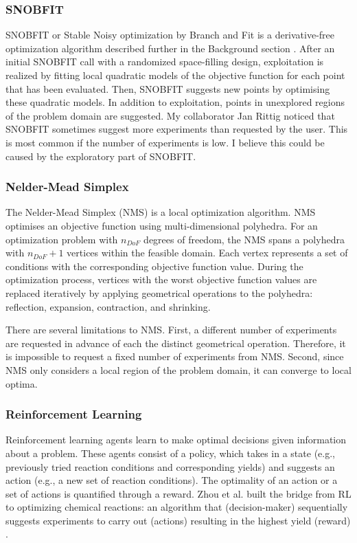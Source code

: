 \subsubsection{SNOBFIT}
SNOBFIT or Stable Noisy optimization by Branch and Fit is a derivative-free optimization algorithm described further in the Background section \cite{Huyer2008}.  After an initial SNOBFIT call with a randomized space-filling design, exploitation is realized by fitting local quadratic  models of the objective function for each point that has been evaluated. Then, SNOBFIT suggests new points by optimising these quadratic models. In addition to exploitation, points in unexplored regions of the problem domain are suggested. My collaborator Jan Rittig noticed that SNOBFIT sometimes suggest more experiments than requested by the user. This is most common if the number of experiments is low. I believe this could be caused by the exploratory part of SNOBFIT.

 \subsubsection{Nelder-Mead Simplex}
The Nelder-Mead Simplex (NMS)\cite{Nelder1965} is a local optimization algorithm.  NMS optimises an objective function using multi-dimensional polyhedra. For an optimization problem with $n_{DoF}$ degrees of freedom, the NMS spans a polyhedra with $n_{DoF} + 1$ vertices within the feasible domain. Each vertex represents a set of conditions with the corresponding objective function value.  During the optimization process, vertices with the worst objective function values are replaced iteratively by applying geometrical operations to the polyhedra: reflection, expansion, contraction, and shrinking. 

There are several limitations to NMS. First, a different number of experiments are requested in advance of each the distinct geometrical operation. Therefore, it is impossible to request a fixed number of experiments from NMS.  Second, since NMS only considers a local region of the problem domain, it can converge to local optima. 
\subsubsection{Reinforcement Learning}
Reinforcement learning agents learn to make optimal decisions given information about a problem.\cite{sutton2018reinforcement} These agents consist of a policy, which takes in a state (e.g., previously tried reaction conditions and corresponding yields) and suggests an action (e.g., a new set of reaction conditions). The optimality of an action or a set of actions is quantified through a reward. Zhou et al. built the bridge from RL to optimizing chemical reactions: an algorithm that (decision-maker) sequentially suggests experiments to carry out (actions) resulting in the highest yield (reward) \cite{Zhou2017}.

